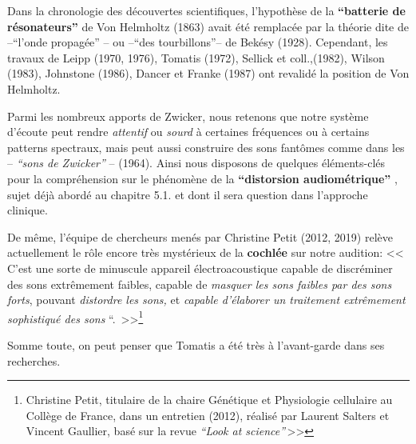 Dans la chronologie des découvertes scientifiques,  l'hypothèse de la \textbf{``batterie de
résonateurs''} de Von Helmholtz (1863)  avait été remplacée par la
théorie dite de  --``l'onde propagée'' -- ou --``des
tourbillons''-- de Bekésy (1928).
Cependant, les travaux de Leipp (1970, 1976), Tomatis (1972), Sellick et coll.,(1982), Wilson (1983),
  Johnstone (1986), Dancer et
  Franke (1987) ont revalidé la position de Von Helmholtz. \autocite[p 24---28,
  ch. 1]{auriol:cle}

  Parmi les nombreux apports de Zwicker, \autocite[p 84]{auriol:cle} nous retenons que notre système d'écoute peut rendre
\textit{attentif} ou\textit{ sourd} à certaines fréquences ou à certains patterns
spectraux, mais peut aussi construire des sons fantômes comme dans les -- \textit{``sons de Zwicker''} -- (1964).
Ainsi nous disposons de quelques éléments-clés pour la compréhension
sur le phénomène de la \textbf{``distorsion audiométrique''} \autocite[p
85]{auriol:cle}, sujet déjà abordé au chapitre 5.1.  et dont il sera question dans l'approche
clinique.



De même, l'équipe de chercheurs menés par Christine Petit (2012, 2019) relève
actuellement
 le rôle encore très mystérieux de la \textbf{cochlée} sur notre audition:
<<\,C'est une sorte de minuscule appareil électroacoustique capable
de discréminer des sons extrêmement faibles, capable de \emph{masquer
les sons faibles par des sons forts}, pouvant \emph{distordre les
sons,} et \emph{capable d'élaborer un traitement extrêmement
sophistiqué des sons} ``. \,>>\footnote{Christine Petit, titulaire de la chaire Génétique et
Physiologie cellulaire au Collège de France, dans un entretien (2012), 
réalisé par Laurent Salters et Vincent Gaullier, basé sur la revue
\textit{``Look at science''}\,>>}

Somme toute, on peut penser que Tomatis a été très à l'avant-garde
dans ses recherches.

